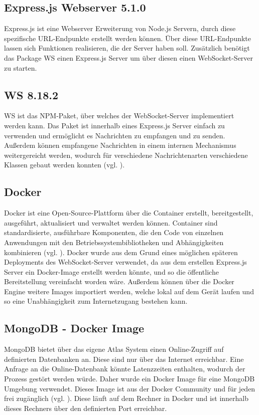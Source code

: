 \subsection{Express.js Webserver 5.1.0}
Express.js ist eine Webserver Erweiterung von Node.js Servern, durch diese spezifische \ac{URL}-Endpunkte erstellt werden können. Über diese \ac{URL}-Endpunkte lassen sich Funktionen realisieren, die der Server haben soll. Zusätzlich benötigt das Package WS einen Express.js Server um über diesen einen WebSocket-Server zu starten. 

\subsection{WS 8.18.2}
WS ist das \ac{NPM}-Paket, über welches der WebSocket-Server implementiert werden kann. Das Paket ist innerhalb eines Express.js Server einfach zu verwenden und ermöglicht es Nachrichten zu empfangen und zu senden. Außerdem können empfangene Nachrichten in einem internen Mechanismus weitergereicht werden, wodurch für verschiedene Nachrichtenarten verschiedene Klassen gebaut werden konnten (vgl. \citealp{websockets_websocketsws_2025}).

\subsection{Docker}
Docker ist eine Open-Source-Plattform über die Container erstellt, bereitgestellt, ausgeführt, aktualisiert und verwaltet werden können. Container sind standardisierte, ausführbare Komponenten, die den Code von einzelnen Anwendungen mit den Betriebssystembibliotheken und Abhängigkeiten kombinieren (vgl. \citealp{noauthor_was_2024}). Docker wurde aus dem Grund eines möglichen späteren Deployments des WebSocket-Server verwendet, da aus dem erstellen Express.js Server ein Docker-Image erstellt werden könnte, und so die öffentliche Bereitstellung vereinfacht worden wäre. Außerdem können über die Docker Engine weitere Images importiert werden, welche lokal auf dem Gerät laufen und so eine Unabhängigkeit zum Internetzugang bestehen kann.

\subsection{MongoDB - Docker Image}
MongoDB bietet über das eigene Atlas System einen Online-Zugriff auf definierten Datenbanken an. Diese sind nur über das Internet erreichbar. Eine Anfrage an die Online-Datenbank könnte Latenzzeiten enthalten, wodurch der Prozess gestört werden würde. Daher wurde ein Docker Image für eine MongoDB Umgebung verwendet. Dieses Image ist aus der Docker Community und für jeden frei zugänglich (vgl. \citealp{noauthor_mongo_nodate}). Diese läuft auf dem Rechner in Docker und ist innerhalb dieses Rechners über den definierten Port erreichbar.

